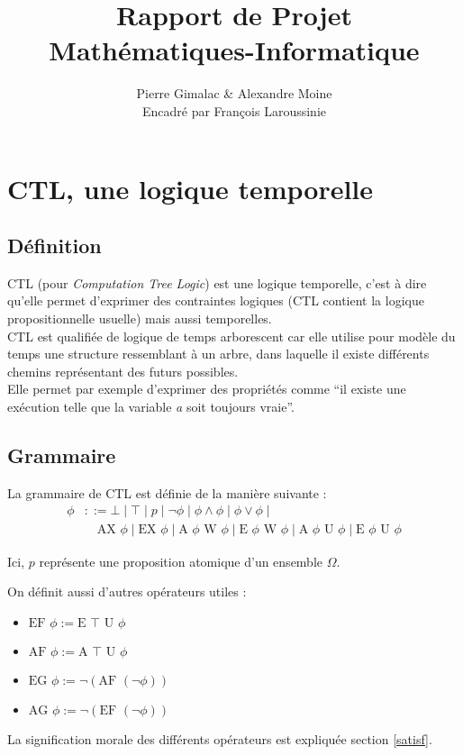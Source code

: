 \documentclass[10pt,a4paper]{article}
\author{Pierre Gimalac \& Alexandre Moine\\\small{Encadré par François Laroussinie}}
\title{Rapport de Projet\\Mathématiques-Informatique}
\begin{document}
\maketitle

\section{CTL, une logique temporelle}
\subsection{Définition}
CTL (pour \textit{Computation Tree Logic}) est une logique temporelle, c'est à dire qu'elle permet d'exprimer des contraintes logiques (CTL contient la logique propositionnelle usuelle) mais aussi temporelles.\\

CTL est qualifiée de logique de temps arborescent car elle utilise pour modèle du temps une structure ressemblant à un arbre, dans laquelle il existe différents chemins représentant des futurs possibles.\\

Elle permet par exemple d'exprimer des propriétés comme ``il existe une exécution telle que la variable \textit{a} soit toujours vraie''.

\subsection{Grammaire}
\label{op}
La grammaire de CTL est définie de la manière suivante :
\begin{align*}
\phi &::= \bot \mid \top \mid p \mid \neg \phi \mid \phi\land\phi \mid \phi\lor\phi \mid \\
&\quad \mbox{AX }\phi \mid \mbox{EX }\phi \mid
\mbox{A }\phi \mbox{ W } \phi \mid \mbox{E }\phi \mbox{ W } \phi \mid
\mbox{A }\phi \mbox{ U } \phi \mid \mbox{E }\phi \mbox{ U } \phi
\end{align*}

Ici, $p$ représente une proposition atomique d'un ensemble $\Omega$.

On définit aussi d'autres opérateurs utiles :
\begin{itemize}
	\item $\mbox{EF } \phi := \mbox{E } \top \mbox{ U } \phi$
	\item $\mbox{AF } \phi := \mbox{A } \top \mbox{ U } \phi$
	\item $\mbox{EG } \phi := \neg (\mbox{AF } (\neg \phi))$
	\item $\mbox{AG } \phi := \neg (\mbox{EF } (\neg \phi))$
\end{itemize}
\bigskip
La signification morale des différents opérateurs est expliquée section \ref{satisf}.
\end{document}
